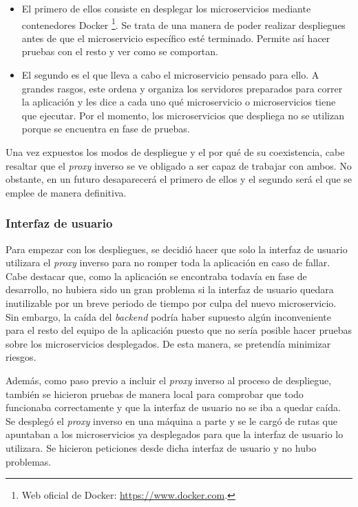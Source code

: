 \documentclass[11pt,spanish,listoffigures]{tfgetsinf}
\begin{document}
\begin{itemize}

	\item El primero de ellos consiste en desplegar los microservicios mediante contenedores Docker \footnote{Web oficial de Docker: \url{https://www.docker.com}.}. Se trata de una manera de poder realizar despliegues antes de que el microservicio específico esté terminado. Permite así hacer pruebas con el resto y ver como se comportan.

	\item El segundo es el que lleva a cabo el microservicio pensado para ello. A grandes rasgos, este ordena y organiza los servidores preparados para correr la aplicación y les dice a cada uno qué microservicio o microservicios tiene que ejecutar. Por el momento, los microservicios que despliega no se utilizan porque se encuentra en fase de pruebas.

\end{itemize}

Una vez expuestos los modos de despliegue y el por qué de su coexistencia, cabe resaltar que el \emph{proxy} inverso se ve obligado a ser capaz de trabajar con ambos. No obstante, en un futuro desaparecerá el primero de ellos y el segundo será el que se emplee de manera definitiva.


			\subsubsection{Interfaz de usuario}

Para empezar con los despliegues, se decidió hacer que solo la interfaz de usuario utilizara el \emph{proxy} inverso para no romper toda la aplicación en caso de fallar. Cabe destacar que, como la aplicación se encontraba todavía en fase de desarrollo, no hubiera sido un gran problema si la interfaz de usuario quedara inutilizable por un breve periodo de tiempo por culpa del nuevo microservicio. Sin embargo, la caída del \emph{backend} podría haber supuesto algún inconveniente para el resto del equipo de la aplicación puesto que no sería posible hacer pruebas sobre los microservicios desplegados. De esta manera, se pretendía minimizar riesgos.

Además, como paso previo a incluir el \emph{proxy} inverso al proceso de despliegue, también se hicieron pruebas de manera local para comprobar que todo funcionaba correctamente y que la interfaz de usuario no se iba a quedar caída. Se desplegó el \emph{proxy} inverso en una máquina a parte y se le cargó de rutas que apuntaban a los microservicios ya desplegados para que la interfaz de usuario lo utilizara. Se hicieron peticiones desde dicha interfaz de usuario y no hubo problemas.
\end{document}
